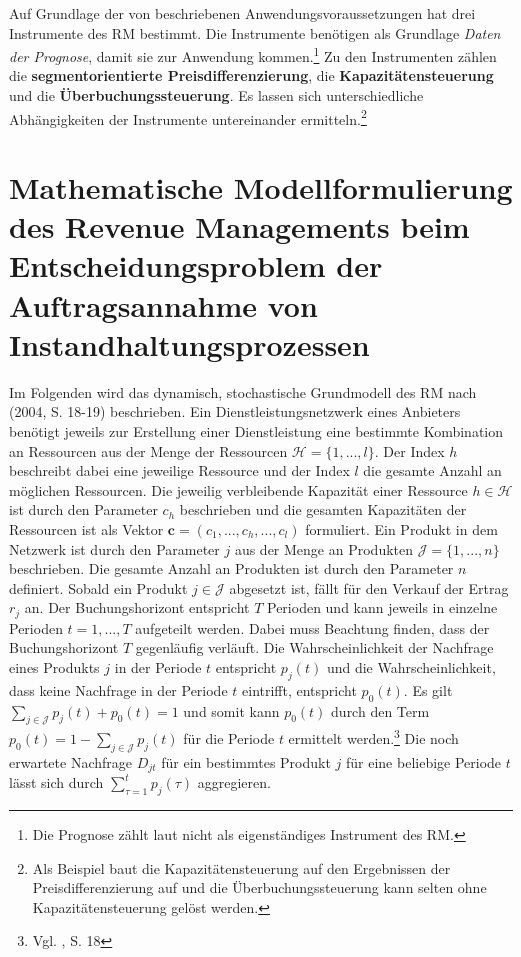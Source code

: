 Auf Grundlage der von \cite{friege1996yield} beschriebenen Anwendungsvoraussetzungen hat \cite{Petrick:2009aa} drei Instrumente des RM bestimmt. Die Instrumente benötigen als Grundlage \textit{Daten der Prognose}, damit sie zur Anwendung kommen.\footnote{Die Prognose zählt laut \cite{Petrick:2009aa} nicht als eigenständiges Instrument des RM.} Zu den Instrumenten zählen die \textbf{segmentorientierte Preisdifferenzierung}, die \textbf{Kapazitäten\-steuerung} und die \textbf{Über\-buchungssteuerung}. Es lassen sich unterschiedliche Ab\-hängigkeit\-en der Instrumente untereinander ermitteln.\footnote{Als Beispiel baut die Kapazitätensteu\-erung auf den Ergebnissen der Preisdifferenzierung auf und die Überbuchungssteuerung kann selten ohne Kapazitätensteuerung gelöst werden.}

\section{Mathematische Modellformulierung des Revenue Managements beim Entscheidungsproblem der Auftragsannahme von Instandhaltungsprozessen}
Im Folgenden wird das dynamisch, stochastische Grundmodell des RM nach \citeauthor{talluri2004revenue} (2004, S. 18-19) beschrieben. Ein Dienstleistungsnetzwerk eines Anbieters benötigt jeweils zur Erstellung einer Dienstleistung eine bestimmte Kombination an Ressourcen aus der Menge der Ressourcen $\mathcal{H} = \{1,...,l \}$. Der Index $h$ beschreibt dabei eine jeweilige Ressource und der Index $l$ die gesamte Anzahl an möglichen Ressourcen. Die jeweilig verbleibende Kapazität einer Ressource $h \in \mathcal{H}$ ist durch den Parameter $c_{h}$ beschrieben und die gesamten Kapazitäten der Ressourcen ist als Vektor $\textbf{c}=(c_{1},...,c_{h},...,c_{l})$ formuliert. Ein Produkt in dem Netzwerk ist durch den Parameter $j$ aus der Menge an Produkten $\mathcal{J} = \{1,...,n \}$ %
beschrieben. Die gesamte Anzahl an Produkten ist durch den Parameter $n$ definiert. Sobald ein Produkt $j\in \mathcal{J}$ abgesetzt ist, fällt für den Verkauf der Ertrag $r_{j}$ an. Der Buchungshorizont entspricht $T$ Perioden und kann jeweils in einzelne Perioden $t=1,...,T$ aufgeteilt werden. Dabei muss Beachtung finden, dass der Buchungshorizont $T$ gegenläufig verläuft. Die Wahrscheinlichkeit der Nachfrage eines Produkts $j$ in der Periode $t$ entspricht $p_{j}(t)$ und die Wahrscheinlichkeit, dass keine Nachfrage in der Periode $t$ eintrifft, entspricht $p_{0}(t)$. Es gilt $\sum_{j\in \mathcal{J}}p_{j}(t)+p_{0}(t)=1$ und somit kann $p_{0}(t)$ durch den Term $p_{0}(t)=1-\sum_{j\in \mathcal{J}}p_{j}(t)$ für die Periode $t$ ermittelt werden.\footnote{Vgl. \citeauthor{talluri2004revenue}, S. 18} Die noch erwartete Nachfrage $D_{jt}$ für ein bestimmtes Produkt $j$ für eine beliebige Periode $t$ lässt sich durch $\sum_{\tau=1}^{t}p_{j}(\tau)$ aggregieren.\\

